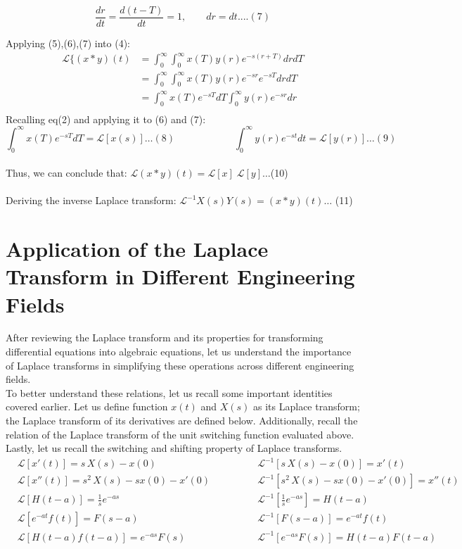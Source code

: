 \documentclass[12pt]{article}
\theoremstyle{plain}
\theoremstyle{definition}
\begin{document}
\begin{equation*} \frac{dr}{dt} = \frac{d(t-T)}{dt} = 1, \qquad dr = dt ....(7)
\end{equation*}

Applying (5),(6),(7) into (4):
\begin{align*}
\mathcal{L}\{(x * y) (t) &= \int_{0}^{\infty} \int_{0}^{\infty} x(T) y(r)e^{-s(r+T)} drdT \\
&= \int_{0}^{\infty}\int_{0}^{\infty} x(T) y(r) e^{-sr} e^{-sT}drdT\\
&=\int_{0}^{\infty}x(T) e^{-sT}dT\int_{0}^{\infty}y(r)e^{-sr}dr \\
\end{align*}
Recalling eq(2) and applying it to (6) and (7):
\begin{equation*}
\int_{0}^{\infty}x(T)e^{-sT} dT = \mathcal{L} [x(s)] \dots (8) \qquad \qquad \qquad
\int_{0}^{\infty}y(r)e^{-st}dt = \mathcal{L} [y(r)] \dots(9)
\end{equation*}
\\
Thus, we can conclude that: $\mathcal{L}(x * y)(t) = \mathcal{L}[x]\; \mathcal{L}[y] \dots $(10)\\
\\
Deriving the inverse Laplace transform: $\mathcal{L^{-1}}{X(s)Y(s)} = {(x*y)(t)} \dots $ (11)
\section{Application of the Laplace Transform in Different Engineering Fields}
    After reviewing the Laplace transform and its properties for transforming differential equations into algebraic equations, let us understand the importance of Laplace transforms in simplifying  these operations across different engineering fields.
\\
    To better understand these relations, let us recall some important identities covered earlier. Let us define function $x(t)$ and $X(s)$ as its Laplace transform; the Laplace transform of its derivatives are defined below. Additionally, recall the relation of the Laplace transform of the unit switching function evaluated above. Lastly, let us recall the switching and shifting property of Laplace transforms.
\begin{align*}
&\mathcal{L}[x'(t)] = s\, X(s) - x(0)  &\mathcal{L}^{-1}[s\, X(s) - x(0)] = x'(t) \\
&\mathcal{L}[x''(t)] = s^2\,X(s) - sx(0) - x'(0) \qquad \qquad &\mathcal{L}^{-1}[s^2\,X(s) - sx(0) - x'(0)] = x''(t)\\ 
&\mathcal{L}[H(t-a)] = \frac{1}{s}e^{-as}  &\mathcal{L}^{-1}[\frac{1}{s}e^{-as}] = H(t-a)\\
&\mathcal{L}[e^{-at}f(t)] = F(s - a) &\mathcal{L}^{-1}[F(s - a)] = e^{-at}f(t)\\
&\mathcal{L}[H(t-a)f(t-a)] = e^{-as}F(s) &\mathcal{L}^{-1}[e^{-as}F(s)] = H(t-a) F(t-a)
\end{align*}
\\
\end{document}

